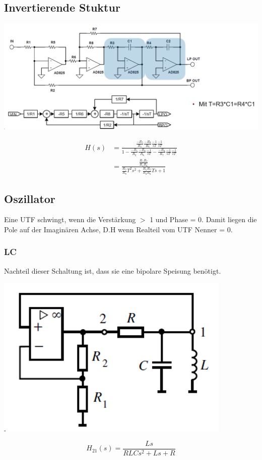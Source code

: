 \subsection{Invertierende Stuktur}
\begin{center}
	\includegraphics[width=\columnwidth]{Images/invert_filter}
\end{center}
\begin{align*}
	H(s) &= \frac{\frac{-R_5}{R_1}\frac{-R_8}{R_6}\frac{-1}{sT}\frac{-1}{sT}}{1-\frac{-R_5}{R_2}\frac{-R_8}{R_6}\frac{-1}{sT}-\frac{-R_8}{R_7}\frac{-1}{sT}\frac{-1}{sT}} \\
	& = \frac{\frac{R_5R_7}{R_1R_6}}{\frac{R_7}{R_8}T^2s^2 + \frac{R_5R_7}{R_2R_6}Ts + 1}
\end{align*}


\subsection{Oszillator}
Eine UTF schwingt, wenn die Verstärkung $\gt$ 1 und Phase = 0. Damit liegen die Pole auf der Imaginären Achse, D.H wenn Realteil vom UTF Nenner = 0.
\subsubsection{LC}
Nachteil dieser Schaltung ist, dass sie eine bipolare Speisung benötigt.
\begin{center}
	\includegraphics[width=0.4\columnwidth]{Images/lc}
\end{center}
\[
H_{21}(s) = \frac{Ls}{RLCs^2 + Ls +R}
\]

